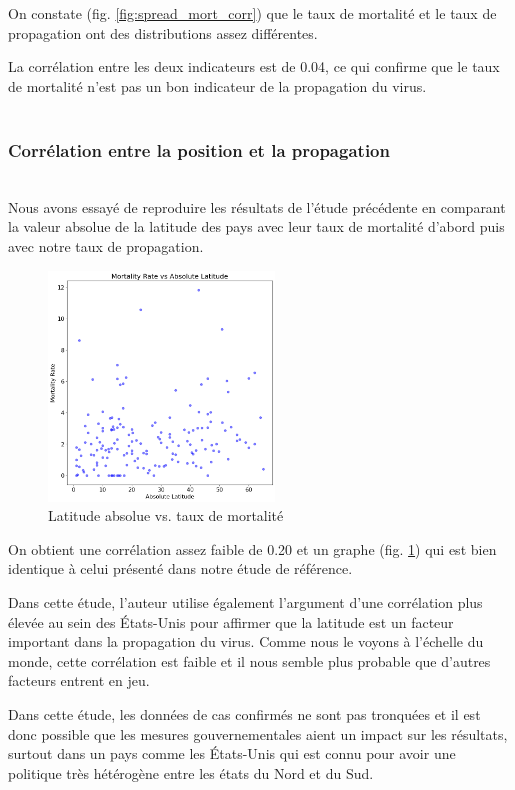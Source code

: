 \documentclass[12pt]{iEEEtran}
\begin{document}
On constate (fig. \ref{fig:spread_mort_corr}) que le taux de mortalité et le taux de propagation
ont des distributions assez différentes.

La corrélation entre les deux indicateurs est de 0.04, ce qui confirme que le taux de mortalité
n'est pas un bon indicateur de la propagation du virus.
\\
\\

\subsubsection{Corrélation entre la position et la propagation}\hfill\\

Nous avons essayé de reproduire les résultats de l'étude précédente \cite{kaggle} en comparant
la valeur absolue de la latitude des pays avec leur taux de mortalité d'abord puis avec notre taux de propagation.

\begin{figure}[h]
    \centering
    \includegraphics[width=6cm]{img/mort_lat.png}
    \caption{Latitude absolue vs. taux de mortalité}
    \label{fig:mort_lat}
\end{figure}

On obtient une corrélation assez faible de 0.20 et un graphe (fig. \ref{fig:mort_lat})
qui est bien identique à celui présenté dans notre étude de référence.

Dans cette étude, l'auteur utilise également l'argument d'une corrélation plus élevée
au sein des États-Unis pour affirmer que la latitude est un facteur important dans la
propagation du virus. Comme nous le voyons à l'échelle du monde, cette corrélation
est faible et il nous semble plus probable que d'autres facteurs entrent en jeu.

Dans
cette étude, les données de cas confirmés ne sont pas tronquées et il est donc possible
que les mesures gouvernementales aient un impact sur les résultats, surtout dans un pays
comme les États-Unis qui est connu pour avoir une politique très hétérogène entre les 
états du Nord et du Sud.
\end{document}
